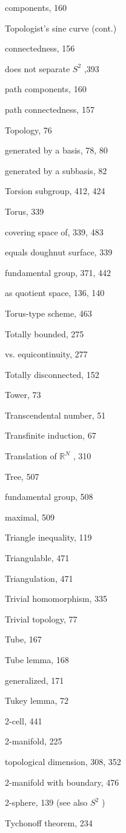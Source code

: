 components, 160

Topologist's sine curve (cont.)

connectedness, 156

does not separate \({S}^{2}\) ,393

path components, 160

path connectedness, 157

Topology, 76

generated by a basis, 78, 80

generated by a subbasis, 82

Torsion subgroup, 412, 424

Torus, 339

covering space of, 339, 483

equals doughnut surface, 339

fundamental group, 371, 442

as quotient space, 136, 140

Torus-type scheme, 463

Totally bounded, 275

vs. equicontinuity, 277

Totally disconnected, 152

Tower, 73

Transcendental number, 51

Transfinite induction, 67

Translation of \({\mathbb{R}}^{N}\) , 310

Tree, 507

fundamental group, 508

maximal, 509

Triangle inequality, 119

Triangulable, 471

Triangulation, 471

Trivial homomorphism, 335

Trivial topology, 77

Tube, 167

Tube lemma, 168

generalized, 171

Tukey lemma, 72

2-cell, 441

2-manifold, 225

topological dimension, 308, 352

2-manifold with boundary, 476

2-sphere, 139 (see also \({S}^{2}\) )

Tychonoff theorem, 234

